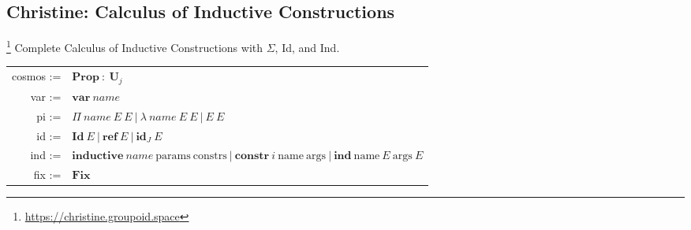 \documentclass{article}
\theoremstyle{definition}
\theoremstyle{plain}
\begin{document}
\subsection{Christine: Calculus of Inductive Constructions \cite{paulinmohring}}\footnote{\url{https://christine.groupoid.space}}
Complete Calculus of Inductive Constructions with $\Sigma$, Id, and Ind.
\begin{table}[ht!]
\centering
\begin{tabular}{rl}
 cosmos :=&$\textbf{Prop}\ :\ \textbf{U}_j$ \\
    var :=&$\textbf{var}\ name$ \\
     pi :=&$\Pi\ name\ E\ E\ |\ \lambda\ name\ E\ E\ |\ E\ E$ \\
     id :=&$\textbf{Id}\ E\ |\ \textbf{ref}\ E\ |\ \textbf{id$_J$}\ E$ \\
    ind :=&$\textbf{inductive}\ name\ \textrm{params}\ \textrm{constrs}\ |\ \textbf{constr}\ i\ \textrm{name}\ \textrm{args}\ |\ \textbf{ind}\ \textrm{name}\ E\ \textrm{args}\ E$ \\
    fix :=&$\textbf{Fix}$ \\
\end{tabular}
\end{table}
\end{document}
